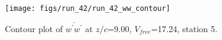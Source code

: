 \begin{figure}[H]
\centering
\texttt{[image: figs/run\_42/run\_42\_ww\_contour]}
\caption{Contour plot of $\overline{w^\prime w^\prime}$ at $z/c$=9.00, $V_{free}$=17.24, station 5.}
\label{fig:run_42_ww_contour}
\end{figure}


